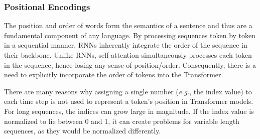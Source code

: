 \begin{comment}
In conclusion, the Transformer decoder uses uni-directional self-attention to condition each output vector on every preceding input vector, including its corresponding input vector. Cross-attention is then used to condition each output vector on each contextualized vector output by the encoder. 

\end{comment}



\subsubsection{Positional Encodings}

The position and order of words form the semantics of a sentence and thus are a fundamental component of any language. By processing sequences token by token in a sequential manner, \acp{RNN} inherently integrate the order of the sequence in their backbone. Unlike \acp{RNN}, self-attention simultaneously processes each token in the sequence, hence losing any sense of position/order. Consequently, there is a need to explicitly incorporate the order of tokens into the Transformer.

There are many reasons why assigning a single number (\textit{e.g.}, the index value) to each time step is not used to represent a token's position in Transformer models. For long sequences, the indices can grow large in magnitude. If the index value is normalized to lie between 0 and 1, it can create problems for variable length sequences, as they would be normalized differently. 


